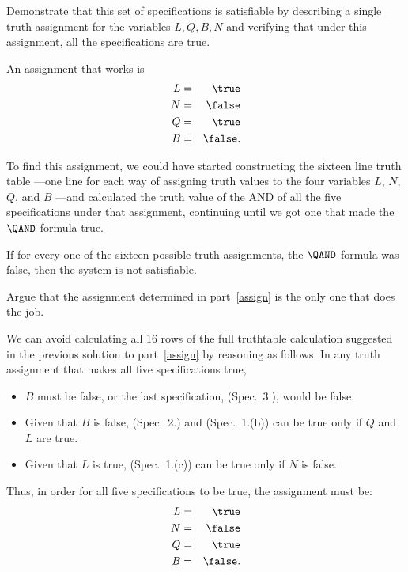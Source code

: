 \documentclass[handout]{mcs}
\begin{document}
\begin{problem}
\ppart\label{assign} Demonstrate that this set of specifications is
satisfiable by describing a single truth assignment for the variables
$L,Q,B,N$ and verifying that under this assignment, all the specifications
are true.

\begin{solution}
An assignment that works is
\begin{eqnarray*}
L       & = &   \true \\
N       & = &   \false \\
Q       & = &   \true \\
B       & = &   \false.
\end{eqnarray*}

To find this assignment, we could have started constructing the sixteen
line truth table ---one line for each way of assigning truth values to the
four variables $L$, $N$, $Q$, and $B$ ---and calculated the truth value of
the AND of all the five specifications under that assignment, continuing
until we got one that made the $\QAND$-formula true.

If for every one of the sixteen possible truth assignments, the
$\QAND$-formula was false, then the system is not satisfiable.
\end{solution}

\ppart Argue that the assignment determined in
part~\eqref{assign} is the only one that does the job.

\begin{solution}
We can avoid calculating all 16 rows of the full truthtable
  calculation suggested in the previous solution to part~\eqref{assign} by
  reasoning as follows.  In any truth assignment that makes all five
  specifications true,
\begin{itemize}

\item $B$ must be false, or the last specification, (Spec.\ 3.), would be
false.

\item Given that $B$ is false, (Spec.\ 2.) and (Spec.\ 1.(b)) can be
true only if $Q$ and $L$ are true.

\item Given that $L$ is true, (Spec.\ 1.(c)) can
be true only if $N$ is false.

\end{itemize}
Thus, in order for all five specifications to be true, the assignment must be:
\begin{eqnarray*}
L       & = &   \true \\
N       & = &   \false \\
Q       & = &   \true \\
B       & = &   \false.
\end{eqnarray*}

\end{solution}

\eparts
\end{problem}
\end{document}
